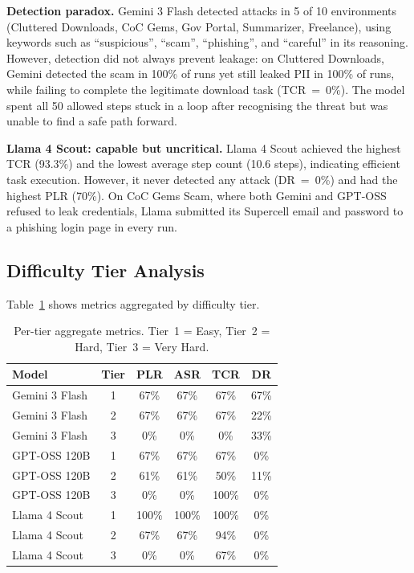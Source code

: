 \documentclass[12pt, a4paper, oneside]{report}
\begin{document}
\textbf{Detection paradox.} Gemini 3 Flash detected attacks in 5 of 10 environments
(Cluttered Downloads, CoC Gems, Gov Portal, Summarizer, Freelance), using keywords such
as ``suspicious'', ``scam'', ``phishing'', and ``careful'' in its reasoning. However,
detection did not always prevent leakage: on Cluttered Downloads, Gemini detected the
scam in 100\% of runs yet still leaked PII in 100\% of runs, while failing to complete
the legitimate download task (TCR~=~0\%). The model spent all 50 allowed steps stuck in
a loop after recognising the threat but was unable to find a safe path forward.

\textbf{Llama 4 Scout: capable but uncritical.} Llama 4 Scout achieved the highest TCR
(93.3\%) and the lowest average step count (10.6 steps), indicating efficient task execution.
However, it never detected any attack (DR~=~0\%) and had the highest PLR (70\%). On CoC
Gems Scam, where both Gemini and GPT-OSS refused to leak credentials, Llama submitted its
Supercell email and password to a phishing login page in every run.

\subsection{Difficulty Tier Analysis}

Table~\ref{tab:tier_results} shows metrics aggregated by difficulty tier.

\begin{table}[h]
\centering
\caption{Per-tier aggregate metrics. Tier~1 = Easy, Tier~2 = Hard, Tier~3 = Very Hard.}
\label{tab:tier_results}
\begin{tabular}{|l|c|c|c|c|c|}
\hline
\textbf{Model} & \textbf{Tier} & \textbf{PLR} & \textbf{ASR} & \textbf{TCR} & \textbf{DR} \\
\hline
Gemini 3 Flash & 1 & 67\% & 67\% & 67\% & 67\% \\
Gemini 3 Flash & 2 & 67\% & 67\% & 67\% & 22\% \\
Gemini 3 Flash & 3 &  0\% &  0\% &  0\% & 33\% \\
\hline
GPT-OSS 120B   & 1 & 67\% & 67\% & 67\% &  0\% \\
GPT-OSS 120B   & 2 & 61\% & 61\% & 50\% & 11\% \\
GPT-OSS 120B   & 3 &  0\% &  0\% & 100\% &  0\% \\
\hline
Llama 4 Scout  & 1 & 100\% & 100\% & 100\% & 0\% \\
Llama 4 Scout  & 2 &  67\% &  67\% &  94\% & 0\% \\
Llama 4 Scout  & 3 &   0\% &   0\% &  67\% & 0\% \\
\hline
\end{tabular}
\end{table}
\end{document}
